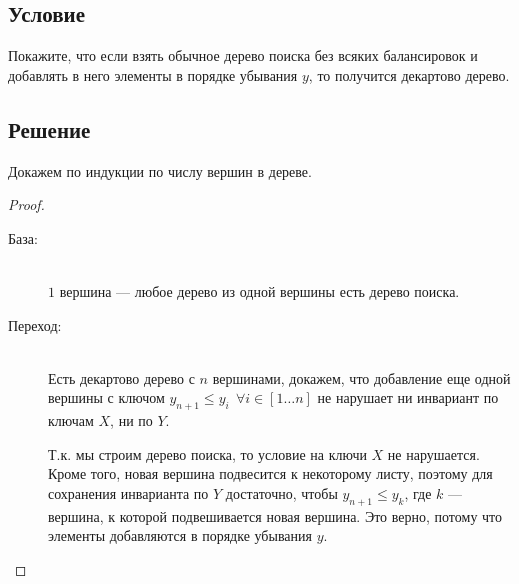 \documentclass[12pt, a4paper]{article}
\begin{document}
\subsection*{Условие}

Покажите, что если взять обычное дерево поиска без всяких балансировок и добавлять в него элементы в порядке убывания $y$, то получится декартово дерево.

\subsection*{Решение}

Докажем по индукции по числу вершин в дереве.
\begin{proof}
    \begin{description}
        \item[База:] \hfill \\ $1$ вершина --- любое дерево из одной вершины есть дерево поиска.
        \item[Переход:] \hfill \\ Есть декартово дерево с $n$ вершинами, докажем, что добавление еще одной вершины с ключом $y_{n+1} \leq y_i \ \ \forall i\in[1\ldots n]$ не нарушает ни инвариант по ключам $X$, ни по $Y$.
        
        Т.к. мы строим дерево поиска, то условие на ключи $X$ не нарушается. Кроме того, новая вершина подвесится к некоторому листу, поэтому для сохранения инварианта по $Y$ достаточно, чтобы $y_{n+1}\leq y_k$, где $k$ --- вершина, к которой подвешивается новая вершина. Это верно, потому что элементы добавляются в порядке убывания $y$.
 

\end{description}
\end{proof}
\end{document}
